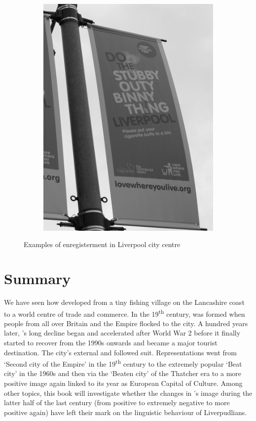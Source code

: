 \begin{figure}[h]
\begin{subfigure}[h]{0.45\textwidth}
				\includegraphics[width=\textwidth]{figures/stubby}
			\end{subfigure}
		\caption{Examples of enregisterment in Liverpool city centre}
		\label{fig.posters}
	\end{figure}

\section{Summary}\label{sec.hist.con}

We have seen how  developed from a tiny fishing village on the Lancashire coast to a world centre of trade and commerce.
In the 19\textsuperscript{th} century,  was formed when people from all over Britain and the Empire flocked to the city.
A hundred years later, 's long decline began and accelerated after World War 2 before it finally started to recover from the 1990s onwards and became a major tourist destination.
The city's external and  followed suit.
Representations went from `Second city of the Empire' in the 19\textsuperscript{th} century to the extremely popular `Beat city' in the 1960s and then via the `Beaten city' of the Thatcher era to a more positive image again linked to its year as European Capital of Culture.
Among other topics, this book will investigate whether the changes in 's image during the latter half of the last century (from positive to extremely negative to more positive again) have left their mark on the linguistic behaviour of Liverpudlians.